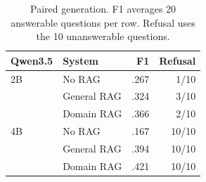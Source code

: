 \begin{table}[t]
\centering
\begin{tabular}{llrr}
\toprule
Qwen3.5 & System & F1 & Refusal \\
\midrule
2B & No RAG & .267 & 1/10 \\
 & General RAG & .324 & 3/10 \\
 & Domain RAG & .366 & 2/10 \\
\midrule
4B & No RAG & .167 & 10/10 \\
 & General RAG & .394 & 10/10 \\
 & Domain RAG & .421 & 10/10 \\
\bottomrule
\end{tabular}
\caption{Paired generation. F1 averages 20 answerable questions per row. Refusal uses the 10 unanswerable questions.}
\label{tab:answers}
\end{table}
